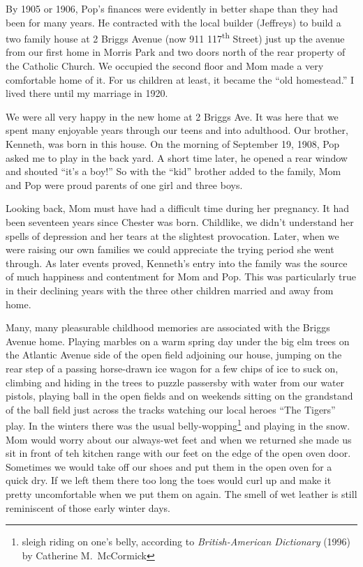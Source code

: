 \documentclass[12pt]{book}              %
\begin{document}

By 1905 or 1906, Pop's finances were evidently in better shape than they had been for many years. He contracted with the local builder (Jeffreys) to build a two family house at 2 Briggs Avenue (now 911 117\textsuperscript{th} Street) just up the avenue from our first home in Morris Park and two doors north of the rear property of the Catholic Church. We occupied the second floor and Mom made a very comfortable home of it. For us children at least, it became the ``old homestead.'' I lived there until my marriage in 1920.

We were all very happy in the new home at 2 Briggs Ave. It was here that we spent many enjoyable years through our teens and into adulthood. Our brother, Kenneth, was born in this house. On the morning of September 19, 1908, Pop asked me to play in the back yard. A short time later, he opened a rear window and shouted ``it's a boy!'' So with the ``kid'' brother added to the family, Mom and Pop were proud parents of one girl and three boys. 

Looking back, Mom must have had a difficult time during her pregnancy. It had been seventeen years since Chester was born. Childlike, we didn't understand her spells of depression and her tears at the slightest provocation. Later, when we were raising our own families we could appreciate the trying period she went through. As later events proved, Kenneth's entry into the family was the source of much happiness and contentment for Mom and Pop. This was particularly true in their declining years with the three other children married and away from home.

Many, many pleasurable childhood memories are associated with the Briggs Avenue home. Playing marbles on a warm spring day under the big elm trees on the Atlantic Avenue side of the open field adjoining our house, jumping on the rear step of a passing horse-drawn ice wagon for a few chips of ice to suck on, climbing and hiding in the trees to puzzle passersby with water from our water pistols, playing ball in the open fields and on weekends sitting on the grandstand of the ball field just across the tracks watching our local heroes ``The Tigers'' play. In the winters there was the usual belly-wopping\footnote{sleigh riding on one's belly, according to {\it British-American Dictionary} (1996) by Catherine M.~McCormick} and playing in the snow. Mom would worry about our always-wet feet and when we returned she made us sit in front of teh kitchen range with our feet on the edge of the open oven door. Sometimes we would take off our shoes and put them in the open oven for a quick dry. If we left them there too long the toes would curl up and make it pretty uncomfortable when we put them on again. The smell of wet leather is still reminiscent of those early winter days. 
\end{document}
